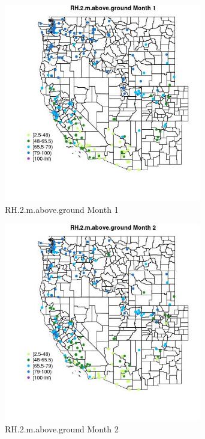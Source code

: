 \begin{figure} 
\centering  
\includegraphics[width=0.77\textwidth]{Code_Outputs/Report_ML_input_PM25_Step4_part_e_de_duplicated_aveswNAs_MapObsMo1RH2maboveground.jpg} 
\caption{\label{fig:Report_ML_input_PM25_Step4_part_e_de_duplicated_aveswNAsMapObsMo1RH2maboveground}RH.2.m.above.ground Month 1} 
\end{figure} 
 

\begin{figure} 
\centering  
\includegraphics[width=0.77\textwidth]{Code_Outputs/Report_ML_input_PM25_Step4_part_e_de_duplicated_aveswNAs_MapObsMo2RH2maboveground.jpg} 
\caption{\label{fig:Report_ML_input_PM25_Step4_part_e_de_duplicated_aveswNAsMapObsMo2RH2maboveground}RH.2.m.above.ground Month 2} 
\end{figure} 
 

